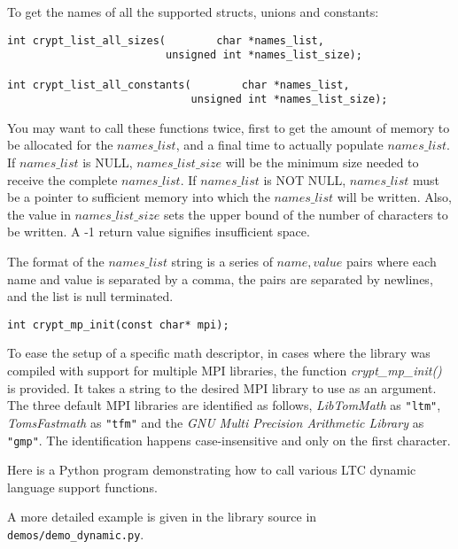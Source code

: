 \documentclass[synpaper]{book}
\begin{document}
To get the names of all the supported structs, unions and constants:
\begin{verbatim}
int crypt_list_all_sizes(        char *names_list,
                         unsigned int *names_list_size);

int crypt_list_all_constants(        char *names_list,
                             unsigned int *names_list_size);
\end{verbatim}
You may want to call these functions twice, first to get the amount
of memory to be allocated for the $names\_list$, and a final time to
actually populate $names\_list$.  If $names\_list$ is NULL,
$names\_list\_size$ will be the minimum size needed to receive the
complete $names\_list$.  If $names\_list$ is NOT NULL, $names\_list$ must
be a pointer to sufficient memory into which the $names\_list$ will be
written.  Also, the value in $names\_list\_size$ sets the upper bound of
the number of characters to be written.  A -1 return value signifies
insufficient space.

The format of the $names\_list$ string is a series of $name,value$ pairs
where each name and value is separated by a comma, the pairs are separated
by newlines, and the list is null terminated.

\begin{verbatim}
int crypt_mp_init(const char* mpi);
\end{verbatim}

To ease the setup of a specific math descriptor, in cases where the library was compiled with support for multiple MPI libraries,
the function \textit{crypt\_mp\_init()} is provided.
It takes a string to the desired MPI library to use as an argument.
The three default MPI libraries are identified as follows, \textit{LibTomMath} as \texttt{"ltm"}, \textit{TomsFastmath} as \texttt{"tfm"}
and the \textit{GNU Multi Precision Arithmetic Library} as \texttt{"gmp"}.
The identification happens case-insensitive and only on the first character.

Here is a Python program demonstrating how to call various LTC dynamic
language support functions.

A more detailed example is given in the library source in \texttt{demos/demo\_dynamic.py}.
\end{document}

